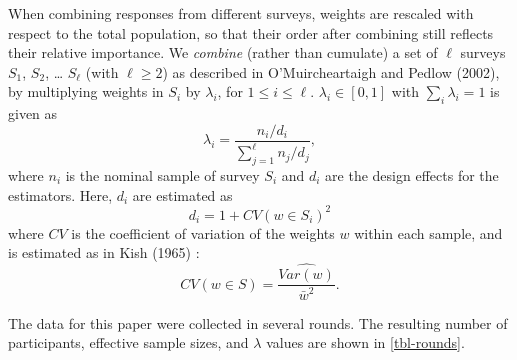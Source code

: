 \documentclass[
]{jds}
\begin{document}
When combining responses from different surveys, weights are rescaled
with respect to the total population, so that their order after
combining still reflects their relative importance. We \emph{combine}
(rather than cumulate) a set of \(\ell\) surveys \(S_1\), \(S_2\),
\ldots{} \(S_\ell\) (with \(\ell \ge 2\)) as described in
O'Muircheartaigh and Pedlow (2002), by multiplying weights in \(S_i\) by
\(\lambda_i\), for \(1 \le i \le \ell\). \(\lambda_i \in [0,1]\) with
\(\sum_i \lambda_i = 1\) is given as \begin{equation}
\lambda_i = \frac{n_i/d_i}{\sum_{j=1}^{\ell}n_j/d_j},
\end{equation} where \(n_i\) is the nominal sample of survey \(S_i\) and
\(d_i\) are the design effects for the estimators. Here, \(d_i\) are
estimated as \begin{equation}
d_i = 1 + CV(w \in S_i)^2
\end{equation} where \(CV\) is the coefficient of variation of the
weights \(w\) within each sample, and is estimated as in Kish (1965) :
\begin{equation}
CV(w \in S) = \frac{\widehat{Var(w)}}{\bar{w}^2}.
\end{equation}

The data for this paper were collected in several rounds. The resulting
number of participants, effective sample sizes, and \(\lambda\) values
are shown in \autoref{tbl-rounds}.
\end{document}
